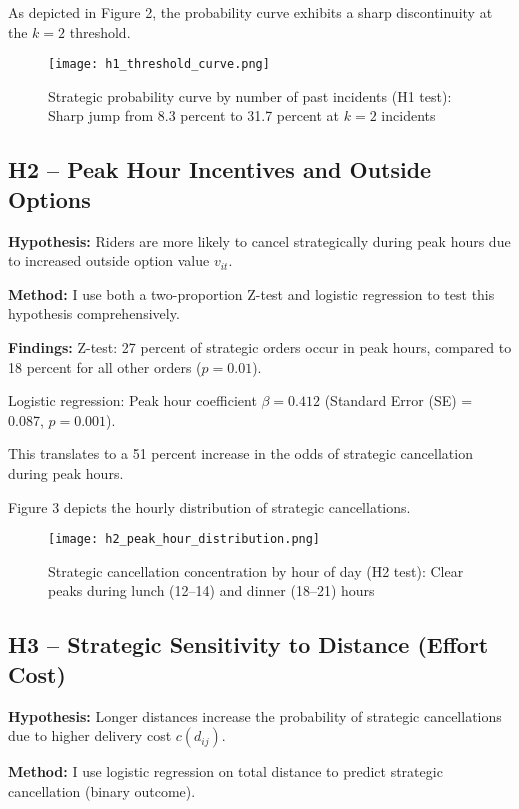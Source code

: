 \documentclass[12pt,letterpaper]{article}
\begin{document}
As depicted in Figure 2, the probability curve exhibits a sharp discontinuity at the $k = 2$ threshold.

\begin{figure}[H]
\centering
\texttt{[image: h1\_threshold\_curve.png]}
\caption{Strategic probability curve by number of past incidents (H1 test): Sharp jump from 8.3 percent to 31.7 percent at $k = 2$ incidents}
\label{fig:h1_curve}
\end{figure}

\subsection{H2 -- Peak Hour Incentives and Outside Options}

\textbf{Hypothesis:} Riders are more likely to cancel strategically during peak hours due to increased outside option value $v_{it}$.

\textbf{Method:} I use both a two-proportion Z-test and logistic regression to test this hypothesis comprehensively.

\textbf{Findings:}  
Z-test: 27 percent of strategic orders occur in peak hours, compared to 18 percent for all other orders ($p = 0.01$).

Logistic regression: Peak hour coefficient $\beta = 0.412$ (Standard Error (SE) = 0.087, $p = 0.001$).

This translates to a 51 percent increase in the odds of strategic cancellation during peak hours.

Figure 3 depicts the hourly distribution of strategic cancellations.

\begin{figure}[H]
\centering
\texttt{[image: h2\_peak\_hour\_distribution.png]}
\caption{Strategic cancellation concentration by hour of day (H2 test): Clear peaks during lunch (12--14) and dinner (18--21) hours}
\label{fig:h2_distribution}
\end{figure}

\subsection{H3 -- Strategic Sensitivity to Distance (Effort Cost)}

\textbf{Hypothesis:} Longer distances increase the probability of strategic cancellations due to higher delivery cost $c(d_{ij})$.

\textbf{Method:} I use logistic regression on total distance to predict strategic cancellation (binary outcome).
\end{document}

